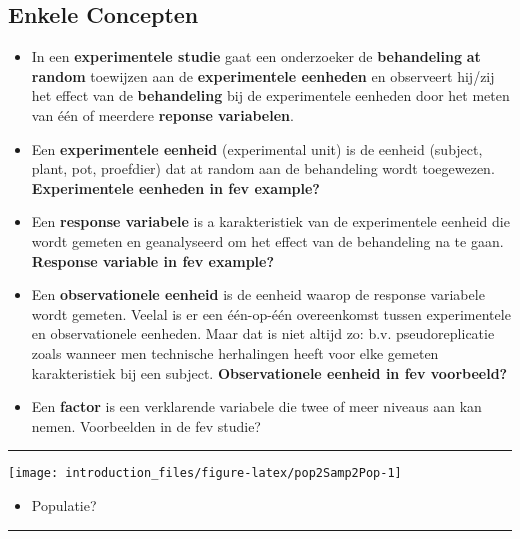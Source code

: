 \documentclass[
]{article}
\providecommand{\tightlist}{%
  \setlength{\itemsep}{0pt}\setlength{\parskip}{0pt}}
\begin{document}
\hypertarget{enkele-concepten}{%
\subsection{Enkele Concepten}\label{enkele-concepten}}

\begin{itemize}
\item
  In een \textbf{experimentele studie} gaat een onderzoeker de
  \textbf{behandeling} \textbf{at random} toewijzen aan de
  \textbf{experimentele eenheden} en observeert hij/zij het effect van
  de \textbf{behandeling} bij de experimentele eenheden door het meten
  van één of meerdere \textbf{reponse variabelen}.
\item
  Een \textbf{experimentele eenheid} (experimental unit) is de eenheid
  (subject, plant, pot, proefdier) dat at random aan de behandeling
  wordt toegewezen. \textbf{Experimentele eenheden in fev example?}
\item
  Een \textbf{response variabele} is a karakteristiek van de
  experimentele eenheid die wordt gemeten en geanalyseerd om het effect
  van de behandeling na te gaan. \textbf{Response variable in fev
  example?}
\item
  Een \textbf{observationele eenheid} is de eenheid waarop de response
  variabele wordt gemeten. Veelal is er een één-op-één overeenkomst
  tussen experimentele en observationele eenheden. Maar dat is niet
  altijd zo: b.v. pseudoreplicatie zoals wanneer men technische
  herhalingen heeft voor elke gemeten karakteristiek bij een subject.
  \textbf{Observationele eenheid in fev voorbeeld?}
\item
  Een \textbf{factor} is een verklarende variabele die twee of meer
  niveaus aan kan nemen. Voorbeelden in de fev studie?
\end{itemize}

\begin{center}\rule{0.5\linewidth}{0.5pt}\end{center}

\begin{center}\texttt{[image: introduction\_files/figure-latex/pop2Samp2Pop-1]} \end{center}

\begin{itemize}
\tightlist
\item
  Populatie?
\end{itemize}

\begin{center}\rule{0.5\linewidth}{0.5pt}\end{center}
\end{document}

